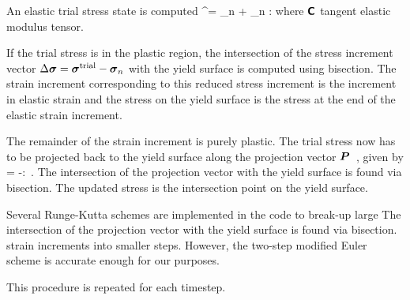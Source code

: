 An elastic trial stress state is computed
\Beq
  \Bsig^\Trial = \Bsig_n + \SfC_n : \Delta\BVeps
\Eeq
where $\boldsymbol{\mathsf{C}}$ tangent elastic modulus tensor.

If the trial stress is in the plastic region, the intersection of the stress increment
vector $\Delta \boldsymbol{\sigma} = \boldsymbol{\sigma}^{\text{trial}} - \boldsymbol{\sigma}_n$ with the yield surface is 
computed using bisection.  The strain increment corresponding to this reduced stress
increment is the increment in elastic strain and the stress on the yield surface is
the stress at the end of the elastic strain increment.

The remainder of the strain increment is purely plastic.  The trial stress now has to be
projected back to the yield surface along the projection vector $\boldsymbol{P}$~\cite{Brannon2000a}, given by
\Beq  
  \BP = -\SfC :  \,.
\Eeq  
The intersection of the projection vector with the yield surface is found via bisection.
The updated stress is the intersection point on the yield surface.

Several Runge-Kutta schemes are implemented in the \Vaango code to break-up large
The intersection of the projection vector with the yield surface is found via bisection.
strain increments into smaller steps.  However, the two-step modified Euler scheme is accurate
enough for our purposes.

This procedure is repeated for each timestep.
